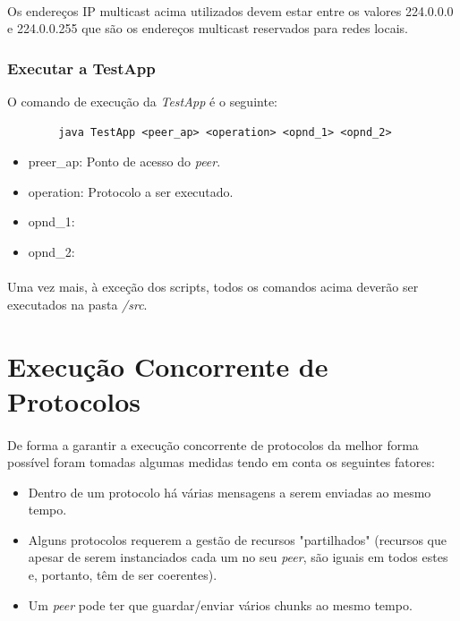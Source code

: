 \documentclass[11pt,oneside]{book}
\begin{document}
    \paragraph{}
        Os endereços IP multicast acima utilizados devem estar entre os valores 224.0.0.0 e
        224.0.0.255 que são os endereços multicast reservados para redes locais.
    
    \subsubsection{Executar a TestApp}
    O comando de execução da \textit{TestApp} é o seguinte:
    \begin{lstlisting}
        java TestApp <peer_ap> <operation> <opnd_1> <opnd_2> 
    \end{lstlisting}
    \begin{itemize}
        \item preer\_ap: Ponto de acesso do \textit{peer}.
        \item operation: Protocolo a ser executado.
        \item opnd\_1: 
        \item opnd\_2: 
    \end{itemize}

    \paragraph{}
    Uma vez mais, à exceção dos scripts, todos os comandos acima deverão ser executados 
    na pasta \textit{/src}.

\pagebreak

\section{Execução Concorrente de Protocolos}
\paragraph{}
    De forma a garantir a execução concorrente de protocolos da melhor forma
    possível foram tomadas algumas medidas tendo em conta os seguintes fatores:
    \begin{itemize}
        \item  Dentro de um protocolo há várias mensagens a serem enviadas ao mesmo tempo.
        \item  Alguns protocolos requerem a gestão de recursos "partilhados" (recursos que
        apesar de serem instanciados cada um no seu \textit{peer}, são iguais em todos estes e,
        portanto, têm de ser coerentes).
        \item  Um \textit{peer} pode ter que guardar/enviar vários chunks ao mesmo tempo.
    \end{itemize}
 
\end{document}
